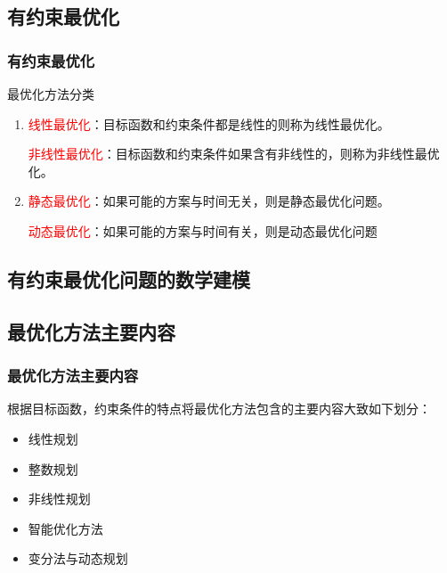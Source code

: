 \documentclass[slidestop,compress,mathserif,c]{beamer}
\makeatletter
\newcommand{\tablecell}[2]{\begin{tabular}{@{}#1@{}}#2\end{tabular}}   %
\makeatother
\begin{document}
\subsection{\hfill 有约束最优化}
\begin{frame}
\frametitle{有约束最优化}
最优化方法分类
\begin{enumerate}[(1)~]
  \item \textcolor{red}{线性最优化}：目标函数和约束条件都是线性的则称为线性最优化。
    
    \textcolor{red}{非线性最优化}：目标函数和约束条件如果含有非线性的，则称为非线性最优化。
     
  \item \textcolor{red}{静态最优化}：如果可能的方案与时间无关，则是静态最优化问题。
        
    \textcolor{red}{动态最优化}：如果可能的方案与时间有关，则是动态最优化问题
\end{enumerate}

\end{frame}

\subsection{\hfill 有约束最优化问题的数学建模}

\subsection{\hfill 最优化方法主要内容}
\begin{frame}
\frametitle{最优化方法主要内容}
根据目标函数，约束条件的特点将最优化方法包含的主要内容大致如下划分：
\begin{itemize}
\item 线性规划
\item 整数规划
\item 非线性规划
\item 智能优化方法
\item 变分法与动态规划
\end{itemize}
\end{frame}
\end{document}
